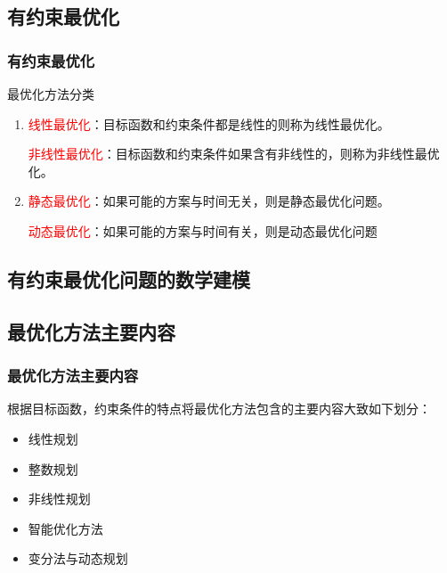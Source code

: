 \documentclass[slidestop,compress,mathserif,c]{beamer}
\makeatletter
\newcommand{\tablecell}[2]{\begin{tabular}{@{}#1@{}}#2\end{tabular}}   %
\makeatother
\begin{document}
\subsection{\hfill 有约束最优化}
\begin{frame}
\frametitle{有约束最优化}
最优化方法分类
\begin{enumerate}[(1)~]
  \item \textcolor{red}{线性最优化}：目标函数和约束条件都是线性的则称为线性最优化。
    
    \textcolor{red}{非线性最优化}：目标函数和约束条件如果含有非线性的，则称为非线性最优化。
     
  \item \textcolor{red}{静态最优化}：如果可能的方案与时间无关，则是静态最优化问题。
        
    \textcolor{red}{动态最优化}：如果可能的方案与时间有关，则是动态最优化问题
\end{enumerate}

\end{frame}

\subsection{\hfill 有约束最优化问题的数学建模}

\subsection{\hfill 最优化方法主要内容}
\begin{frame}
\frametitle{最优化方法主要内容}
根据目标函数，约束条件的特点将最优化方法包含的主要内容大致如下划分：
\begin{itemize}
\item 线性规划
\item 整数规划
\item 非线性规划
\item 智能优化方法
\item 变分法与动态规划
\end{itemize}
\end{frame}
\end{document}
